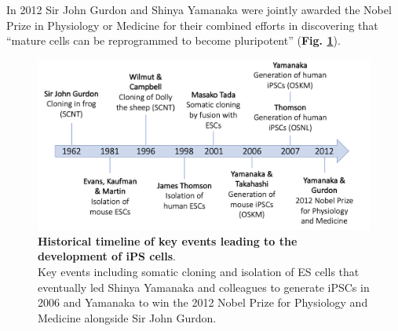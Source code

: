 In 2012 Sir John Gurdon and Shinya Yamanaka were jointly awarded the Nobel Prize in Physiology or Medicine for their combined efforts in discovering that “mature cells can be reprogrammed to become pluripotent” \cite{nobel2012press} (\textbf{Fig. \ref{fig:ipsc_timeline}}).    










\begin{figure}[h]
\centering
\includegraphics[width=15cm]{Chapter1/Fig/ipsc_timeline.png}
\caption[iPSCs timeline]{\textbf{Historical timeline of key events leading to the development of iPS cells}.\\
Key events including somatic cloning and isolation of ES cells that eventually led Shinya Yamanaka and colleagues to generate iPSCs in 2006 and Yamanaka to win the 2012 Nobel Prize for Physiology and Medicine alongside Sir John Gurdon.}
\label{fig:ipsc_timeline}
\end{figure}

